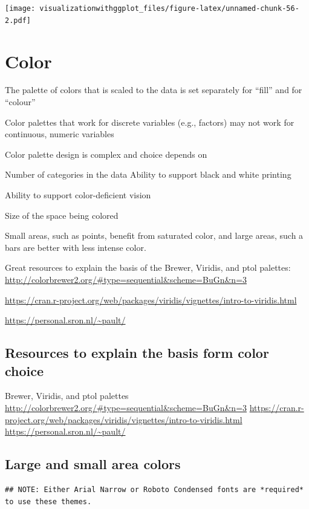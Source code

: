 \documentclass[]{krantz}
\theoremstyle{definition}
\theoremstyle{definition}
\theoremstyle{definition}
\theoremstyle{remark}
\begin{document}
\texttt{[image: visualizationwithggplot\_files/figure-latex/unnamed-chunk-56-2.pdf]}

\section{Color}\label{color}

The palette of colors that is scaled to the data is set separately for
``fill'' and for ``colour''

Color palettes that work for discrete variables (e.g., factors) may not
work for continuous, numeric variables

Color palette design is complex and choice depends on

Number of categories in the data Ability to support black and white
printing

Ability to support color-deficient vision

Size of the space being colored

Small areas, such as points, benefit from saturated color, and large
areas, such a bars are better with less intense color.

Great resources to explain the basis of the Brewer, Viridis, and ptol
palettes:
\url{http://colorbrewer2.org/\#type=sequential\&scheme=BuGn\&n=3}

\url{https://cran.r-project.org/web/packages/viridis/vignettes/intro-to-viridis.html}

\url{https://personal.sron.nl/~pault/}

\subsection{Resources to explain the basis form color
choice}\label{resources-to-explain-the-basis-form-color-choice}

Brewer, Viridis, and ptol palettes
\url{http://colorbrewer2.org/\#type=sequential\&scheme=BuGn\&n=3}
\url{https://cran.r-project.org/web/packages/viridis/vignettes/intro-to-viridis.html}
\url{https://personal.sron.nl/~pault/}

\subsection{Large and small area
colors}\label{large-and-small-area-colors}

\begin{verbatim}
## NOTE: Either Arial Narrow or Roboto Condensed fonts are *required* to use these themes.
\end{verbatim}
\end{document}
